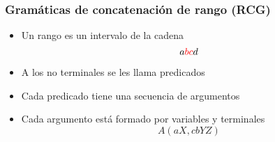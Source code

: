 \documentclass{beamer}
\begin{document}
\begin{frame}
    \frametitle{Gramáticas de concatenación de rango (RCG)}
    
    \begin{itemize}
        \item Un rango es un intervalo de la cadena
              $$a\textcolor{red}{bc}d$$
              \pause
        \item A los no terminales se les llama predicados
              \pause
        \item Cada predicado tiene una secuencia de argumentos
              \pause        
        \item Cada argumento está formado por variables y terminales
              $$A(aX,cbYZ)$$
    \end{itemize}
\end{frame}
\end{document}

